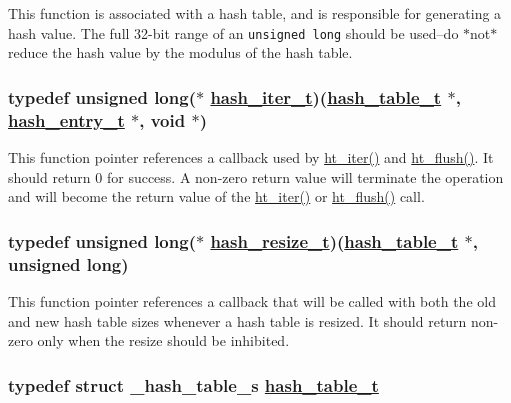 This function is associated with a hash table, and is responsible for generating a hash value. The full 32-bit range of an {\tt unsigned long} should be used--do $\ast$not$\ast$ reduce the hash value by the modulus of the hash table. \hypertarget{group__dbprim__hash_a2}{
\subsubsection[hash\_\-iter\_\-t]{\setlength{\rightskip}{0pt plus 5cm}typedef unsigned long($\ast$ \hyperlink{dbprim_8h_a2}{hash\_\-iter\_\-t})(\hyperlink{dbprim_8h_a0}{hash\_\-table\_\-t} $\ast$, \hyperlink{dbprim_8h_a1}{hash\_\-entry\_\-t} $\ast$, void $\ast$)}}
\label{group__dbprim__hash_a2}


This function pointer references a callback used by \hyperlink{group__dbprim__hash_a11}{ht\_\-iter()} and \hyperlink{group__dbprim__hash_a12}{ht\_\-flush()}. It should return 0 for success. A non-zero return value will terminate the operation and will become the return value of the \hyperlink{group__dbprim__hash_a11}{ht\_\-iter()} or \hyperlink{group__dbprim__hash_a12}{ht\_\-flush()} call. \hypertarget{group__dbprim__hash_a5}{
\subsubsection[hash\_\-resize\_\-t]{\setlength{\rightskip}{0pt plus 5cm}typedef unsigned long($\ast$ \hyperlink{dbprim_8h_a5}{hash\_\-resize\_\-t})(\hyperlink{dbprim_8h_a0}{hash\_\-table\_\-t} $\ast$, unsigned long)}}
\label{group__dbprim__hash_a5}


This function pointer references a callback that will be called with both the old and new hash table sizes whenever a hash table is resized. It should return non-zero only when the resize should be inhibited. \hypertarget{group__dbprim__hash_a0}{
\subsubsection[hash\_\-table\_\-t]{\setlength{\rightskip}{0pt plus 5cm}typedef struct \_\-hash\_\-table\_\-s \hyperlink{dbprim_8h_a0}{hash\_\-table\_\-t}}}
\label{group__dbprim__hash_a0}


